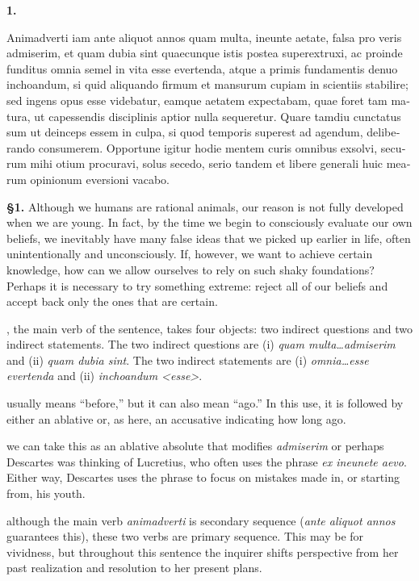 \beginnumbering
\pstart
\textbf{1.} \begin{latin}Animadverti iam ante aliquot annos quam multa, ineunte aetate, falsa pro veris admiserim, et quam dubia sint quaecunque istis postea superextruxi, ac proinde funditus omnia semel in vita esse evertenda, atque a primis fundamentis denuo inchoandum, si quid aliquando firmum et mansurum cupiam in scientiis stabilire; sed ingens opus esse videbatur, eamque aetatem expectabam, quae foret tam matura, ut capessendis disciplinis aptior nulla sequeretur. Quare tamdiu cunctatus sum ut deinceps essem in culpa, si quod temporis superest ad agendum, deliberando consumerem. Opportune igitur hodie mentem curis omnibus exsolvi, securum mihi otium procuravi, solus secedo, serio tandem et libere generali huic mearum opinionum eversioni vacabo.\end{latin}
\pend
\endnumbering

\prenotes

\textbf{§1.} Although we humans are rational animals, our reason is not fully developed when we are young. In fact, by the time we begin to consciously evaluate our own beliefs, we inevitably have many false ideas that we picked up earlier in life, often unintentionally and unconsciously. If, however, we want to achieve certain knowledge, how can we allow ourselves to rely on such shaky foundations? Perhaps it is necessary to try something extreme: reject all of our beliefs and accept back only the ones that are certain.

, the main verb of the sentence, takes four objects: two indirect questions and two indirect statements. The two indirect questions are (i) \textit{quam multa\dots admiserim} and (ii) \textit{quam dubia sint}. The two indirect statements are (i) \textit{omnia\dots esse evertenda} and (ii) \textit{inchoandum <esse>}.

 usually means ``before,'' but it can also mean ``ago.'' In this use, it is followed by either an ablative or, as here, an accusative indicating how long ago.

 we can take this as an ablative absolute that modifies \textit{admiserim} or perhaps Descartes was thinking of Lucretius, who often uses the phrase \textit{ex ineunete aevo}. Either way, Descartes uses the phrase to focus on mistakes made in, or starting from, his youth.

 although the main verb \textit{animadverti} is secondary sequence (\textit{ante aliquot annos} guarantees this), these two verbs are primary sequence. This may be for vividness, but throughout this sentence the inquirer shifts perspective from her past realization and resolution to her present plans.

